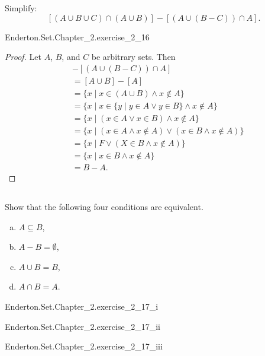 \documentclass{report}
\begin{document}
  Simplify: $$[(A \cup B \cup C) \cap (A \cup B)] - [(A \cup (B - C)) \cap A].$$

    {Enderton.Set.Chapter\_2.exercise\_2\_16}

  \begin{proof}
    Let $A$, $B$, and $C$ be arbitrary sets.
    Then
      \begin{align*}
        [(A \cup B \cup C) \cap (A \cup B)] & - [(A \cup (B - C)) \cap A] \\
          & = [A \cup B] - [A] \\
          & = \{ x \mid x \in (A \cup B) \land x \not\in A \} \\
          & = \{ x \mid x \in \{ y \mid y \in A \lor y \in B \} \land x \not\in A \} \\
          & = \{ x \mid (x \in A \lor x \in B) \land x \not\in A \} \\\
          & = \{ x \mid (x \in A \land x \not\in A) \lor (x \in B \land x \not\in A) \} \\
          & = \{ x \mid F \lor (X \in B \land x \not\in A) \} \\
          & = \{ x \mid x \in B \land x \not\in A \} \\
          & = B - A.
      \end{align*}
  \end{proof}

\subsection{}%

  Show that the following four conditions are equivalent.
  \begin{enumerate}[(a)]
    \item $A \subseteq B$,
    \item $A - B = \emptyset$,
    \item $A \cup B = B$,
    \item $A \cap B = A$.
  \end{enumerate}

    {Enderton.Set.Chapter\_2.exercise\_2\_17\_i}

    {Enderton.Set.Chapter\_2.exercise\_2\_17\_ii}

    {Enderton.Set.Chapter\_2.exercise\_2\_17\_iii}
\end{document}
